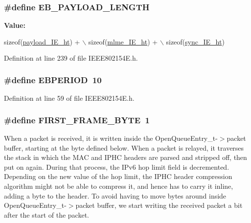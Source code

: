 \subsubsection[{\texorpdfstring{E\+B\+\_\+\+P\+A\+Y\+L\+O\+A\+D\+\_\+\+L\+E\+N\+G\+TH}{EB_PAYLOAD_LENGTH}}]{\setlength{\rightskip}{0pt plus 5cm}\#define E\+B\+\_\+\+P\+A\+Y\+L\+O\+A\+D\+\_\+\+L\+E\+N\+G\+TH}\hypertarget{group___i_e_e_e802154_e_gab0b67b83e90b9aa6ad5a65d50f82fc70}{}\label{group___i_e_e_e802154_e_gab0b67b83e90b9aa6ad5a65d50f82fc70}
{\bfseries Value\+:}
\begin{DoxyCode}
\textcolor{keyword}{sizeof}(\hyperlink{structpayload___i_e__ht}{payload\_IE\_ht}) + \(\backslash\)
                           \textcolor{keyword}{sizeof}(\hyperlink{structmlme___i_e__ht}{mlme\_IE\_ht})     + \(\backslash\)
                           sizeof(\hyperlink{structsync___i_e__ht}{sync\_IE\_ht})
\end{DoxyCode}


Definition at line 239 of file I\+E\+E\+E802154\+E.\+h.

\subsubsection[{\texorpdfstring{E\+B\+P\+E\+R\+I\+OD}{EBPERIOD}}]{\setlength{\rightskip}{0pt plus 5cm}\#define E\+B\+P\+E\+R\+I\+OD~10}\hypertarget{group___i_e_e_e802154_e_ga911ff2fd825b4361a4c994ab69d712f4}{}\label{group___i_e_e_e802154_e_ga911ff2fd825b4361a4c994ab69d712f4}


Definition at line 59 of file I\+E\+E\+E802154\+E.\+h.

\subsubsection[{\texorpdfstring{F\+I\+R\+S\+T\+\_\+\+F\+R\+A\+M\+E\+\_\+\+B\+Y\+TE}{FIRST_FRAME_BYTE}}]{\setlength{\rightskip}{0pt plus 5cm}\#define F\+I\+R\+S\+T\+\_\+\+F\+R\+A\+M\+E\+\_\+\+B\+Y\+TE~1}\hypertarget{group___i_e_e_e802154_e_gaebaf05eba5b262a0b84b5d00237b0c21}{}\label{group___i_e_e_e802154_e_gaebaf05eba5b262a0b84b5d00237b0c21}
When a packet is received, it is written inside the Open\+Queue\+Entry\+\_\+t-\/$>$packet buffer, starting at the byte defined below. When a packet is relayed, it traverses the stack in which the M\+AC and I\+P\+HC headers are parsed and stripped off, then put on again. During that process, the I\+Pv6 hop limit field is decremented. Depending on the new value of the hop limit, the I\+P\+HC header compression algorithm might not be able to compress it, and hence has to carry it inline, adding a byte to the header. To avoid having to move bytes around inside Open\+Queue\+Entry\+\_\+t-\/$>$packet buffer, we start writing the received packet a bit after the start of the packet. 

